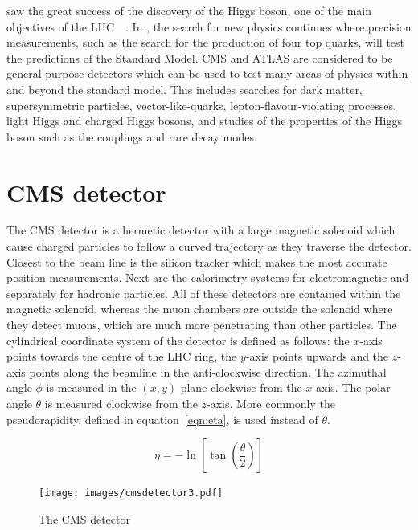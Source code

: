 \runone saw the great success of the discovery of the Higgs boson, one of the main objectives of the LHC~\cite{Aad20121}~\cite{Chatrchyan201230}. In \runtwo, the search for new physics continues where precision measurements, such as the search for the production of four top quarks, will test the predictions of the Standard Model. CMS and ATLAS are considered to be general-purpose detectors which can be used to test many areas of physics within and beyond the standard model. This includes searches for dark matter, supersymmetric particles, vector-like-quarks, lepton-flavour-violating processes, light Higgs and charged Higgs bosons, and studies of the properties of the Higgs boson such as the couplings and rare decay modes.

\section{CMS detector \label{sec:CMSdet}}

The CMS detector is a hermetic detector with a large magnetic solenoid which cause charged particles to follow a curved trajectory as they traverse the detector. Closest to the beam line is the silicon tracker which makes the most accurate position measurements. Next are the calorimetry systems for electromagnetic and separately for hadronic particles. All of these detectors are contained within the magnetic solenoid, whereas the muon chambers are outside the solenoid where they detect muons, which are much more penetrating than other particles. The cylindrical coordinate system of the detector is defined as follows: the $x$-axis points towards the centre of the LHC ring, the $y$-axis points upwards and the $z$-axis points along the beamline in the anti-clockwise direction. The azimuthal angle $\phi$ is measured in the $(x,y)$ plane clockwise from the $x$ axis. The polar angle $\theta$ is measured clockwise from the $z$-axis. More commonly the pseudorapidity, defined in equation~\ref{eqn:eta}, is used instead of $\theta$.

\begin{equation}
    \eta = - \ln \left[ \tan \left(\frac{\theta}{2} \right) \right]
    \label{eqn:eta}
\end{equation}

\begin{figure}[ht!]
\centering
    \texttt{[image: images/cmsdetector3.pdf]}
    \caption{The CMS detector~\cite{1742-6596-513-2-022032}}
    \label{fig:CMSdetector}
\end{figure}


